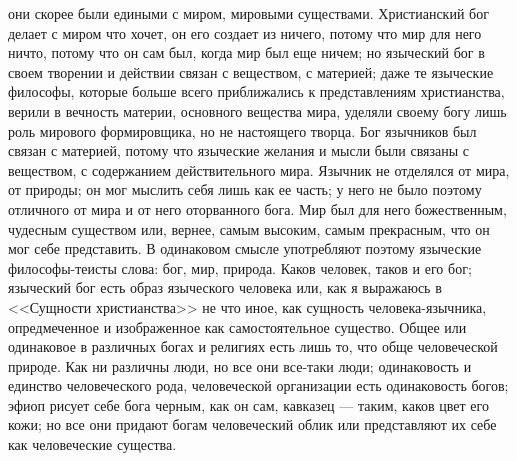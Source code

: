 \documentclass[12pt]{article}
\begin{document}
они скорее были едиными с миром, мировыми существами. Христианский бог делает с миром что хочет, он его создает из ничего, потому что мир для него ничто, потому что он сам был, когда мир был еще ничем; но языческий бог в своем творении и действии связан с веществом, с материей; даже те языческие философы, которые больше всего приближались к представлениям христианства, верили в вечность материи, основного вещества мира, уделяли своему богу лишь роль мирового формировщика, но не настоящего творца. Бог язычников был связан с материей, потому что языческие желания и мысли были связаны с веществом, с содержанием действительного мира. Язычник не отделялся от мира, от природы; он мог мыслить себя лишь как ее часть; у него не было поэтому отличного от мира и от него оторванного бога. Мир был для него божественным, чудесным существом или, вернее, самым высоким, самым прекрасным, что он мог себе представить. В одинаковом смысле употребляют поэтому языческие философы-теисты слова: бог, мир, природа. Каков человек, таков и его бог; языческий бог есть образ языческого человека или, как я выражаюсь в <<Сущности христианства>>  не что иное, как сущность человека-язычника, опредмеченное и изображенное как самостоятельное существо. Общее или одинаковое в различных богах и религиях есть лишь то, что обще человеческой природе. Как ни различны люди, но все они все-таки люди; одинаковость и единство человеческого рода, человеческой организации есть одинаковость богов; эфиоп рисует себе бога черным, как он сам, кавказец --- таким, каков цвет его кожи; но все они придают богам человеческий облик или представляют их себе как человеческие существа. 
\end{document}

